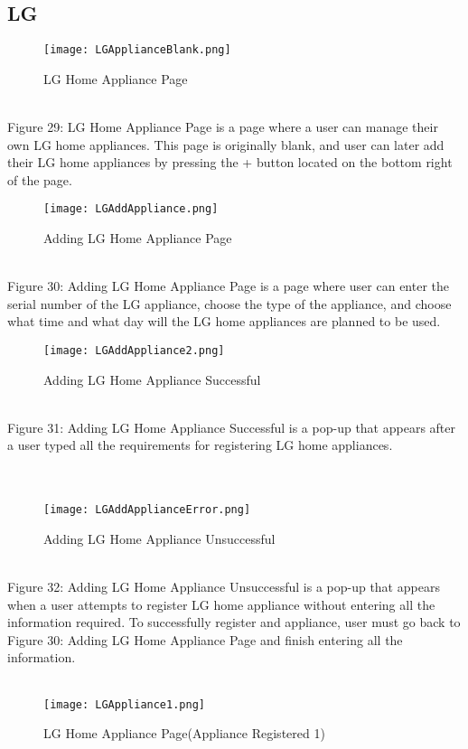 \documentclass[conference]{IEEEtran}
\begin{document}
\subsection{LG}
\begin{figure}[h]
\centerline{\texttt{[image: LGApplianceBlank.png]}}
\caption{LG Home Appliance Page}
\label{fig}
\end{figure}
\\
Figure 29: LG Home Appliance Page is a page where a user can manage their own LG home appliances. This page is originally blank, and user can later add their LG home appliances by pressing the + button located on the bottom right of the page. 
\begin{figure}[h]
\centerline{\texttt{[image: LGAddAppliance.png]}}
\caption{Adding LG Home Appliance Page}
\label{fig}
\end{figure}
\\
\indent Figure 30: Adding LG Home Appliance Page is a page where user can enter the serial number of the LG appliance, choose the type of the appliance, and choose what time and what day will the LG home appliances are planned to be used.
\\
\clearpage
\begin{figure}[h]
\centerline{\texttt{[image: LGAddAppliance2.png]}}
\caption{Adding LG Home Appliance Successful}
\label{fig}
\end{figure}
\\
Figure 31: Adding LG Home Appliance Successful is a pop-up that appears after a user typed all the requirements for registering LG home appliances.
\\\\\\
\begin{figure}[h]
\centerline{\texttt{[image: LGAddApplianceError.png]}}
\caption{Adding LG Home Appliance Unsuccessful}
\label{fig}
\end{figure}
\\
\indent Figure 32: Adding LG Home Appliance Unsuccessful is a pop-up that appears when a user attempts to register LG home appliance without entering all the information required. To successfully register and appliance, user must go back to Figure 30: Adding LG Home Appliance Page and finish entering all the information.
\\\\
\begin{figure}[h]
\centerline{\texttt{[image: LGAppliance1.png]}}
\caption{LG Home Appliance Page(Appliance Registered 1)}
\label{fig}
\end{figure}
\end{document}
